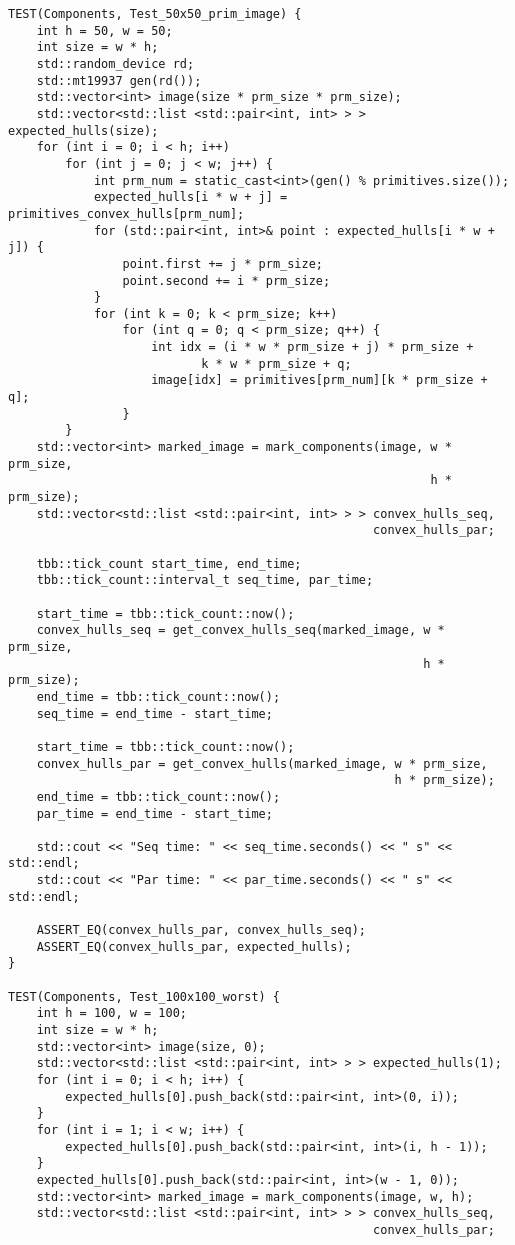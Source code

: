 \documentclass{report}
\begin{document}
\begin{lstlisting}
TEST(Components, Test_50x50_prim_image) {
    int h = 50, w = 50;
    int size = w * h;
    std::random_device rd;
    std::mt19937 gen(rd());
    std::vector<int> image(size * prm_size * prm_size);
    std::vector<std::list <std::pair<int, int> > > expected_hulls(size);
    for (int i = 0; i < h; i++)
        for (int j = 0; j < w; j++) {
            int prm_num = static_cast<int>(gen() % primitives.size());
            expected_hulls[i * w + j] = primitives_convex_hulls[prm_num];
            for (std::pair<int, int>& point : expected_hulls[i * w + j]) {
                point.first += j * prm_size;
                point.second += i * prm_size;
            }
            for (int k = 0; k < prm_size; k++)
                for (int q = 0; q < prm_size; q++) {
                    int idx = (i * w * prm_size + j) * prm_size +
                           k * w * prm_size + q;
                    image[idx] = primitives[prm_num][k * prm_size + q];
                }
        }
    std::vector<int> marked_image = mark_components(image, w * prm_size,
                                                           h * prm_size);
    std::vector<std::list <std::pair<int, int> > > convex_hulls_seq,
                                                   convex_hulls_par;

    tbb::tick_count start_time, end_time;
    tbb::tick_count::interval_t seq_time, par_time;

    start_time = tbb::tick_count::now();
    convex_hulls_seq = get_convex_hulls_seq(marked_image, w * prm_size,
                                                          h * prm_size);
    end_time = tbb::tick_count::now();
    seq_time = end_time - start_time;

    start_time = tbb::tick_count::now();
    convex_hulls_par = get_convex_hulls(marked_image, w * prm_size,
                                                      h * prm_size);
    end_time = tbb::tick_count::now();
    par_time = end_time - start_time;

    std::cout << "Seq time: " << seq_time.seconds() << " s" << std::endl;
    std::cout << "Par time: " << par_time.seconds() << " s" << std::endl;

    ASSERT_EQ(convex_hulls_par, convex_hulls_seq);
    ASSERT_EQ(convex_hulls_par, expected_hulls);
}

TEST(Components, Test_100x100_worst) {
    int h = 100, w = 100;
    int size = w * h;
    std::vector<int> image(size, 0);
    std::vector<std::list <std::pair<int, int> > > expected_hulls(1);
    for (int i = 0; i < h; i++) {
        expected_hulls[0].push_back(std::pair<int, int>(0, i));
    }
    for (int i = 1; i < w; i++) {
        expected_hulls[0].push_back(std::pair<int, int>(i, h - 1));
    }
    expected_hulls[0].push_back(std::pair<int, int>(w - 1, 0));
    std::vector<int> marked_image = mark_components(image, w, h);
    std::vector<std::list <std::pair<int, int> > > convex_hulls_seq,
                                                   convex_hulls_par;


\end{lstlisting}
\end{document}

